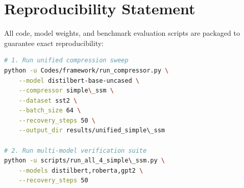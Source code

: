 \section{Reproducibility Statement}
All code, model weights, and benchmark evaluation scripts are packaged to guarantee exact reproducibility:
\begin{lstlisting}[language=bash]
# 1. Run unified compression sweep
python -u Codes/framework/run_compressor.py \
    --model distilbert-base-uncased \
    --compressor simple\_ssm \
    --dataset sst2 \
    --batch_size 64 \
    --recovery_steps 50 \
    --output_dir results/unified_simple\_ssm

# 2. Run multi-model verification suite
python -u scripts/run_all_4_simple\_ssm.py \
    --models distilbert,roberta,gpt2 \
    --recovery_steps 50
\end{lstlisting}

